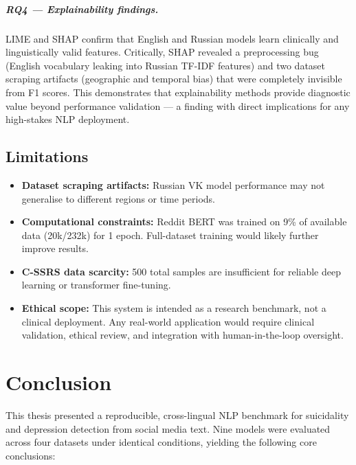 \documentclass[12pt, a4paper, oneside]{report}
\begin{document}
\paragraph{RQ4 — Explainability findings.}
LIME and SHAP confirm that English and Russian models learn clinically and linguistically valid features. Critically, SHAP revealed a preprocessing bug (English vocabulary leaking into Russian TF-IDF features) and two dataset scraping artifacts (geographic and temporal bias) that were completely invisible from F1 scores. This demonstrates that explainability methods provide diagnostic value beyond performance validation — a finding with direct implications for any high-stakes NLP deployment.

\section{Limitations}

\begin{itemize}
    \item \textbf{Dataset scraping artifacts:} Russian VK model performance may not generalise to different regions or time periods.
    \item \textbf{Computational constraints:} Reddit BERT was trained on 9\% of available data (20k/232k) for 1 epoch. Full-dataset training would likely further improve results.
    \item \textbf{C-SSRS data scarcity:} 500 total samples are insufficient for reliable deep learning or transformer fine-tuning.
    \item \textbf{Ethical scope:} This system is intended as a research benchmark, not a clinical deployment. Any real-world application would require clinical validation, ethical review, and integration with human-in-the-loop oversight.
\end{itemize}

\chapter{Conclusion}
\label{ch:conclusion}

This thesis presented a reproducible, cross-lingual NLP benchmark for suicidality and depression detection from social media text. Nine models were evaluated across four datasets under identical conditions, yielding the following core conclusions:
\end{document}
